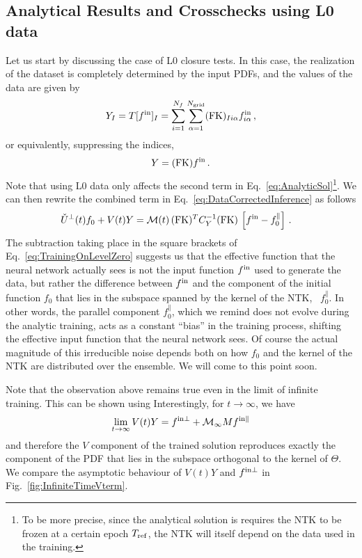 \subsection{Analytical Results and Crosschecks using L0 data}
\label{sec:AnalyticalChecks}
Let us start by discussing the case of L0 closure tests. In this case, the realization
of the dataset is completely determined by the input PDFs, and the values of the data
are given by
\begin{equation}
    \label{eq:DataL0}
    Y_I = T[f^{\rm in}]_I
        = \sum_{i=1}^{N_{f}} \sum_{\alpha=1}^{N_{\mathrm{grid}}} (\mathrm{FK})_{Ii\alpha} f^{\rm in}_{i\alpha}\, ,
\end{equation}
or equivalently, suppressing the indices,
\begin{equation}
    \label{eq:DataL0NoIndices}
    Y = (\mathrm{FK}) f^{\rm in}\, .
\end{equation}
Note that using L0 data only affects the second term in
Eq.~\ref{eq:AnalyticSol}\footnote{To be more precise, since the analytical
solution is requires the NTK to be frozen at a certain epoch $T_{\rm ref}$, the
NTK will itself depend on the data used in the training.}. We can then rewrite the
combined term in Eq.~\eqref{eq:DataCorrectedInference} as follows
\begin{align}
  \label{eq:TrainingOnLevelZero}
  \check{U}^\perp(t) f_0 + V(t) Y 
    &= \mathcal{M}(t)\, (\mathrm{FK})^T C_{Y}^{-1} (\mathrm{FK})\, 
      \left[f^{\rm in} - f_{0}^\parallel\right]\, .
\end{align}
The subtraction taking place in the square brackets of
Eq.~\eqref{eq:TrainingOnLevelZero} suggests us that the effective function that
the neural network actually sees is not the input function $f^{\rm in}$ used to
generate the data, but rather the difference between $f^{\rm in}$ and the component of
the initial function $f_0$ that lies in the subspace spanned by the kernel of
the NTK, \ie\ $f_0^\parallel$. In other words, the parallel component
$f_0^\parallel$, which we remind does not evolve during the analytic training,
acts as a constant ``bias'' in the training process, shifting the effective
input function that the neural network sees. Of course the actual magnitude of
this irreducible noise depends both on how $f_0$ and the kernel of the NTK are
distributed over the ensemble. We will come to this point soon.

Note that the observation above remains true even in the limit of infinite training.
This can be shown using
Interestingly, for $t\to\infty$, we have
\begin{align}
    \label{eq:LevelZeroClosureInfiniteTraining}
    \lim_{t\to\infty} V(t) Y = f^{\rm in \perp} + \mathcal{M}_{\infty} M f^{\rm in \parallel}
\end{align}
and therefore the $V$ component of the trained solution reproduces exactly the
component of the PDF that lies in  the subspace orthogonal to the kernel of
$\Theta$. We compare the asymptotic behaviour of $V(t) Y$ and $f^{\rm in \perp}$ in
Fig.~\ref{fig:InfiniteTimeVterm}.

